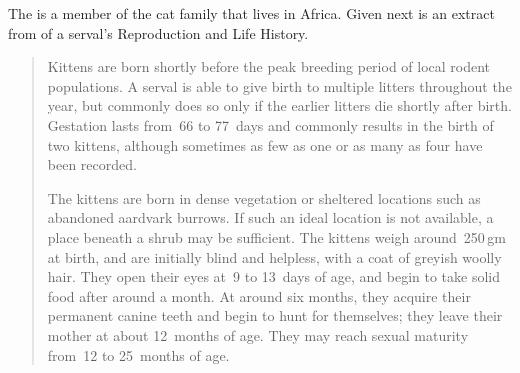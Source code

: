 \begin{example} \label{eg:serval} 
The  is a member of the cat family that lives in Africa.
Given next is an extract from  of a serval's Reproduction and Life History.
\begin{quote}
Kittens are born shortly before the peak breeding period of local rodent populations. A serval is able to give birth to multiple litters throughout the year, but commonly does so only if the earlier litters die shortly after birth. Gestation lasts from~66 to 77~days and commonly results in the birth of two kittens, although sometimes as few as one or as many as four have been recorded.

The kittens are born in dense vegetation or sheltered locations such as abandoned aardvark burrows. If such an ideal location is not available, a place beneath a shrub may be sufficient. The kittens weigh around~250\,gm at birth, and are initially blind and helpless, with a coat of greyish woolly hair. They open their eyes at~9 to 13~days of age, and begin to take solid food after around a month. At around six months, they acquire their permanent canine teeth and begin to hunt for themselves; they leave their mother at about 12~months of age. They may reach sexual maturity from~12 to 25~months of age.


\end{quote}
\end{example}
